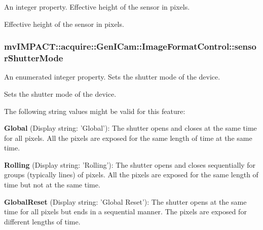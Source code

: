 An integer property. Effective height of the sensor in pixels. 

Effective height of the sensor in pixels. \hypertarget{classmv_i_m_p_a_c_t_1_1acquire_1_1_gen_i_cam_1_1_image_format_control_ae184aeb41a502148279aa64314633ec7}{
\subsubsection[{sensor\+Shutter\+Mode}]{ mv\+I\+M\+P\+A\+C\+T\+::acquire\+::\+Gen\+I\+Cam\+::\+Image\+Format\+Control\+::sensor\+Shutter\+Mode}}\label{classmv_i_m_p_a_c_t_1_1acquire_1_1_gen_i_cam_1_1_image_format_control_ae184aeb41a502148279aa64314633ec7}


An enumerated integer property. Sets the shutter mode of the device. 

Sets the shutter mode of the device.

The following string values might be valid for this feature\+:
\begin{DoxyItemize}
\item {\bfseries Global} (Display string\+: 'Global')\+: The shutter opens and closes at the same time for all pixels. All the pixels are exposed for the same length of time at the same time.
\item {\bfseries Rolling} (Display string\+: 'Rolling')\+: The shutter opens and closes sequentially for groups (typically lines) of pixels. All the pixels are exposed for the same length of time but not at the same time.
\item {\bfseries Global\+Reset} (Display string\+: 'Global Reset')\+: The shutter opens at the same time for all pixels but ends in a sequential manner. The pixels are exposed for different lengths of time.
\end{DoxyItemize}

